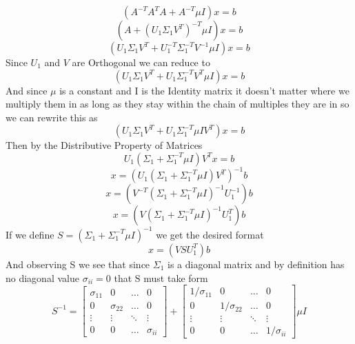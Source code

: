 \documentclass{report}
\begin{document}
\begin{equation}
 (A^{-T}A^TA + A^{-T}\mu I)x = b
\end{equation}
\begin{equation}
 (A + (U_1\Sigma_1 V^T)^{-T}\mu I)x = b
\end{equation}
\begin{equation}
 (U_1\Sigma_1 V^T + U_1^{-T}\Sigma_1^{-T} V^{-1}\mu I)x = b
\end{equation}
Since $U_1$ and $V$ are Orthogonal we can reduce to
\begin{equation}
 (U_1\Sigma_1 V^T + U_1\Sigma_1^{-T} V^T\mu I)x = b
\end{equation}
And since $\mu$ is a constant and I is the Identity matrix it doesn't matter where we multiply them in as long as they stay within the chain of multiples they are in so we can rewrite this as 
\begin{equation}
 (U_1\Sigma_1 V^T + U_1\Sigma_1^{-T}\mu I V^T)x = b
\end{equation}
Then by the Distributive Property of Matrices
\begin{equation}
 U_1(\Sigma_1 + \Sigma_1^{-T}\mu I)V^Tx = b
\end{equation}
\begin{equation}
 x = (U_1(\Sigma_1 + \Sigma_1^{-T}\mu I)V^T)^{-1}b
\end{equation}
\begin{equation}
 x = (V^{-T}(\Sigma_1 + \Sigma_1^{-T}\mu I)^{-1}U_1^{-1})b
\end{equation}
\begin{equation}
 x = (V(\Sigma_1 + \Sigma_1^{-T}\mu I)^{-1}U_1^T)b
\end{equation}
If we define $S=(\Sigma_1 + \Sigma_1^{-T}\mu I)^{-1}$ we get the desired format
\begin{equation}
    x = (VSU_1^T)b
\end{equation}
And observing S we see that since $\Sigma_1$ is a diagonal matrix and by definition has no diagonal value $\sigma_{ii}=0$ that S must take form
\begin{equation}
    S^{-1}=\begin{bmatrix}
    \sigma_{11} & 0 &  \dots  & 0 \\
    0 & \sigma_{22} & \dots  & 0 \\
    \vdots & \vdots & \ddots & \vdots \\
    0 & 0 & \dots  & \sigma_{ii}
\end{bmatrix} + \begin{bmatrix}
    1/\sigma_{11} & 0 &  \dots  & 0 \\
    0 & 1/\sigma_{22} & \dots  & 0 \\
    \vdots & \vdots  & \ddots & \vdots \\
    0 & 0 & \dots  & 1/\sigma_{ii}
\end{bmatrix}\mu I
\end{equation}
\end{document}
